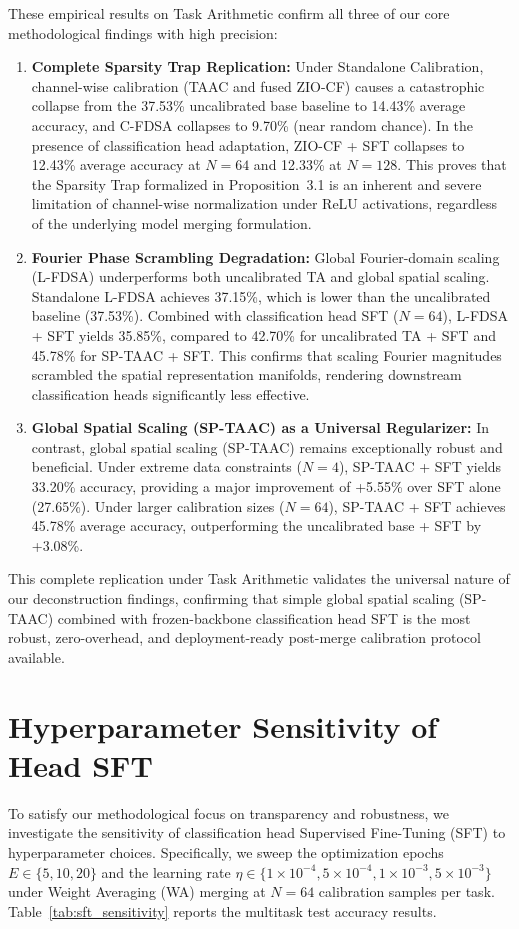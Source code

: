 \documentclass{article}
\theoremstyle{plain}
\theoremstyle{definition}
\theoremstyle{remark}
\begin{document}
These empirical results on Task Arithmetic confirm all three of our core methodological findings with high precision:
\begin{enumerate}
    \item \textbf{Complete Sparsity Trap Replication:} Under Standalone Calibration, channel-wise calibration (TAAC and fused ZIO-CF) causes a catastrophic collapse from the 37.53\% uncalibrated base baseline to 14.43\% average accuracy, and C-FDSA collapses to 9.70\% (near random chance). In the presence of classification head adaptation, ZIO-CF + SFT collapses to 12.43\% average accuracy at $N=64$ and 12.33\% at $N=128$. This proves that the Sparsity Trap formalized in Proposition~3.1 is an inherent and severe limitation of channel-wise normalization under ReLU activations, regardless of the underlying model merging formulation.
    \item \textbf{Fourier Phase Scrambling Degradation:} Global Fourier-domain scaling (L-FDSA) underperforms both uncalibrated TA and global spatial scaling. Standalone L-FDSA achieves 37.15\%, which is lower than the uncalibrated baseline (37.53\%). Combined with classification head SFT ($N=64$), L-FDSA + SFT yields 35.85\%, compared to 42.70\% for uncalibrated TA + SFT and 45.78\% for SP-TAAC + SFT. This confirms that scaling Fourier magnitudes scrambled the spatial representation manifolds, rendering downstream classification heads significantly less effective.
    \item \textbf{Global Spatial Scaling (SP-TAAC) as a Universal Regularizer:} In contrast, global spatial scaling (SP-TAAC) remains exceptionally robust and beneficial. Under extreme data constraints ($N=4$), SP-TAAC + SFT yields 33.20\% accuracy, providing a major improvement of +5.55\% over SFT alone (27.65\%). Under larger calibration sizes ($N=64$), SP-TAAC + SFT achieves 45.78\% average accuracy, outperforming the uncalibrated base + SFT by +3.08\%.
\end{enumerate}
This complete replication under Task Arithmetic validates the universal nature of our deconstruction findings, confirming that simple global spatial scaling (SP-TAAC) combined with frozen-backbone classification head SFT is the most robust, zero-overhead, and deployment-ready post-merge calibration protocol available.

\section{Hyperparameter Sensitivity of Head SFT}
\label{app:sft_sensitivity}
To satisfy our methodological focus on transparency and robustness, we investigate the sensitivity of classification head Supervised Fine-Tuning (SFT) to hyperparameter choices. Specifically, we sweep the optimization epochs $E \in \{5, 10, 20\}$ and the learning rate $\eta \in \{1 \times 10^{-4}, 5 \times 10^{-4}, 1 \times 10^{-3}, 5 \times 10^{-3}\}$ under Weight Averaging (WA) merging at $N=64$ calibration samples per task. Table~\ref{tab:sft_sensitivity} reports the multitask test accuracy results.
\end{document}
